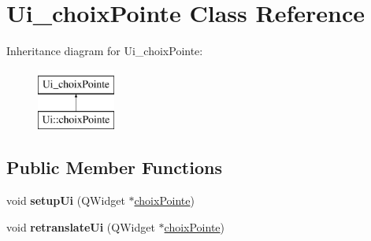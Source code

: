 \hypertarget{class_ui__choix_pointe}{\section{Ui\-\_\-choix\-Pointe Class Reference}
\label{class_ui__choix_pointe}
}
Inheritance diagram for Ui\-\_\-choix\-Pointe\-:\begin{figure}[H]
\begin{center}
\leavevmode
\includegraphics[height=2.000000cm]{class_ui__choix_pointe}
\end{center}
\end{figure}
\subsection*{Public Member Functions}
\begin{DoxyCompactItemize}
\item 
\hypertarget{class_ui__choix_pointe_afb01f288ce6a40c26c0346d1e0024f4e}{void {\bfseries setup\-Ui} (Q\-Widget $\ast$\hyperlink{classchoix_pointe}{choix\-Pointe})}\label{class_ui__choix_pointe_afb01f288ce6a40c26c0346d1e0024f4e}

\item 
\hypertarget{class_ui__choix_pointe_aea42cc3aeeb1ea76b18aeac75a7ec2cc}{void {\bfseries retranslate\-Ui} (Q\-Widget $\ast$\hyperlink{classchoix_pointe}{choix\-Pointe})}\label{class_ui__choix_pointe_aea42cc3aeeb1ea76b18aeac75a7ec2cc}

\end{DoxyCompactItemize}
